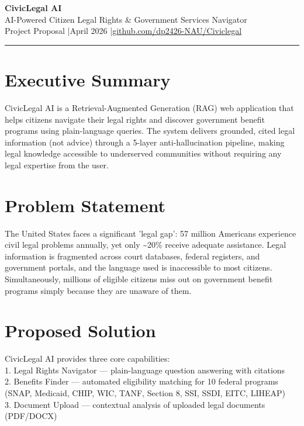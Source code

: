 \documentclass[12pt,a4paper]{article}
\begin{document}
\begin{center}
{\LARGE\bfseries\color{navyblue} CivicLegal AI}\\[0.4em]
{\large\color{steelblue} AI-Powered Citizen Legal Rights \& Government Services Navigator}\\[0.3em]
{\small Project Proposal \quad|\quad April 2026 \quad|\quad \href{https://github.com/dp2426-NAU/Civiclegal}{github.com/dp2426-NAU/Civiclegal}}
\end{center}
\vspace{1em}
\hrule
\vspace{1em}
\section{Executive Summary}
CivicLegal AI is a Retrieval-Augmented Generation (RAG) web application that helps citizens navigate their legal rights and discover government benefit programs using plain-language queries. The system delivers grounded, cited legal information (not advice) through a 5-layer anti-hallucination pipeline, making legal knowledge accessible to underserved communities without requiring any legal expertise from the user.

\section{Problem Statement}
The United States faces a significant 'legal gap': 57 million Americans experience civil legal problems annually, yet only \textasciitilde{}20\% receive adequate assistance. Legal information is fragmented across court databases, federal registers, and government portals, and the language used is inaccessible to most citizens. Simultaneously, millions of eligible citizens miss out on government benefit programs simply because they are unaware of them.

\section{Proposed Solution}
CivicLegal AI provides three core capabilities:\\1. Legal Rights Navigator — plain-language question answering with citations\\2. Benefits Finder — automated eligibility matching for 10 federal programs\\   (SNAP, Medicaid, CHIP, WIC, TANF, Section 8, SSI, SSDI, EITC, LIHEAP)\\3. Document Upload — contextual analysis of uploaded legal documents (PDF/DOCX)
\end{document}
